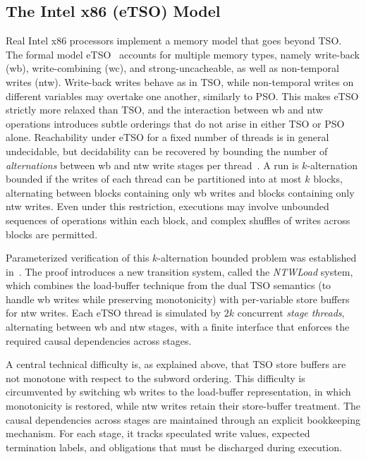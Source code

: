\subsection{The Intel x86 (eTSO) Model}

Real Intel x86 processors implement a memory model that goes beyond TSO. The
formal model eTSO~\cite{RMV22} accounts for multiple memory types, namely
write-back (wb), write-combining (wc), and strong-uncacheable, as well as
non-temporal writes (ntw). Write-back writes behave as in TSO, while
non-temporal writes on different variables may overtake one another, similarly
to PSO. This makes eTSO strictly more relaxed than TSO, and the interaction
between wb and ntw operations introduces subtle orderings that do not arise in
either TSO or PSO alone. Reachability under eTSO for a fixed number of
threads is in general undecidable, but decidability can be recovered by
bounding the number of \emph{alternations} between wb and ntw write stages
per thread~\cite{AABKS24}. A run is $k$-alternation bounded if the writes of
each thread can be partitioned into at most $k$ blocks, alternating between
blocks containing only wb writes and blocks containing only ntw writes. Even
under this restriction, executions may involve unbounded sequences of
operations within each block, and complex shuffles of writes across blocks are
permitted.

Parameterized verification of this $k$-alternation bounded problem was
established in~\cite{AABKS26}. The proof introduces a new transition system,
called the \emph{NTWLoad} system, which combines the load-buffer technique
from the dual TSO semantics (to handle wb writes while preserving monotonicity)
with per-variable store buffers for ntw writes. Each eTSO thread is simulated
by $2k$ concurrent \emph{stage threads}, alternating between wb and ntw
stages, with a finite interface that enforces the required causal dependencies
across stages.

A central technical difficulty is, as explained above, that TSO store buffers
are not monotone with respect to the subword ordering. This difficulty is circumvented by switching wb writes to the
load-buffer representation, in which monotonicity is restored, while ntw
writes retain their store-buffer treatment. The causal dependencies across
stages are maintained through an explicit bookkeeping mechanism. For each
stage, it tracks speculated write values, expected termination labels, and
obligations that must be discharged during execution.


